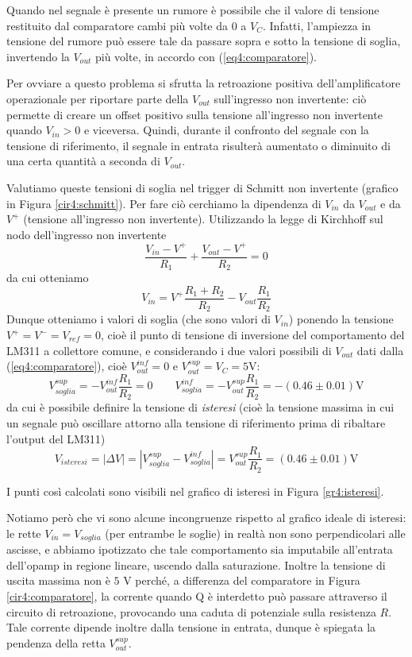Quando nel segnale è presente un rumore è possibile che il valore di tensione restituito dal comparatore cambi più volte da $0$ a $V_{C}$.
Infatti, l'ampiezza in tensione del rumore può essere tale da passare sopra e sotto la tensione di soglia, invertendo la $V_{out}$ più volte, in accordo con (\ref{eq4:comparatore}).

Per ovviare a questo problema si sfrutta la retroazione positiva dell'amplificatore operazionale per riportare parte della $V_{out}$ sull'ingresso non invertente: ciò permette di creare un offset positivo sulla tensione all'ingresso non invertente quando $V_{in}>0$ e viceversa.
Quindi, durante il confronto del segnale con la tensione di riferimento, il segnale in entrata risulterà aumentato o diminuito di una certa quantità a seconda di $V_{out}$.

Valutiamo queste tensioni di soglia nel trigger di Schmitt non invertente (grafico in Figura \ref{cir4:schmitt}).
Per fare ciò cerchiamo la dipendenza di $V_{in}$ da $V_{out}$ e da $V^+$ (tensione all'ingresso non invertente). Utilizzando la legge di Kirchhoff sul nodo dell'ingresso non invertente
$$\frac{V_{in}-V^+}{R_1} + \frac{V_{out}-V^+}{R_2} = 0$$
da cui otteniamo
\begin{equation}
V_{in} = V^+ \frac{R_1+R_2}{R_2} - V_{out} \frac{R_1}{R_2}
\label{eq4:v_in_parte2}
\end{equation}
Dunque otteniamo i valori di soglia (che sono valori di $V_{in}$) ponendo la tensione $V^+=V^-=V_{ref}=0$, cioè il punto di tensione di inversione del comportamento del LM311 a collettore comune, e considerando i due valori possibili di $V_{out}$ dati dalla (\ref{eq4:comparatore}), cioè $V_{out}^{inf}=0$ e $V_{out}^{sup}=V_{C}=5$\si{\volt}:
$$V_{soglia}^{sup} = - V_{out}^{inf} \frac{R_1}{R_2} = 0 \qquad V_{soglia}^{inf} = - V_{out}^{sup} \frac{R_1}{R_2} = - (0.46 \pm 0.01) \si{\volt}$$
da cui è possibile definire la tensione di \textit{isteresi} (cioè la tensione massima in cui un segnale può oscillare attorno alla tensione di riferimento prima di ribaltare l'output del LM311)
$$V_{isteresi} = |\Delta V| = |V_{soglia}^{sup} - V_{soglia}^{inf}| = V_{out}^{sup} \frac{R_1}{R_2} = (0.46 \pm 0.01) \si{\volt}$$

I punti così calcolati sono visibili nel grafico di isteresi in Figura \ref{gr4:isteresi}.

Notiamo però che vi sono alcune incongruenze rispetto al grafico ideale di isteresi: le rette $V_{in}=V_{soglia}$ (per entrambe le soglie) in realtà non sono perpendicolari alle ascisse, e abbiamo ipotizzato che tale comportamento sia imputabile all'entrata dell'opamp in regione lineare, uscendo dalla saturazione.
Inoltre la tensione di uscita massima non è $5$ \si{\volt} perché, a differenza del comparatore in Figura \ref{cir4:comparatore}, la corrente quando Q è interdetto può passare attraverso il circuito di retroazione, provocando una caduta di potenziale sulla resistenza $R$.
Tale corrente dipende inoltre dalla tensione in entrata, dunque è spiegata la pendenza della retta $V_{out}^{sup}$.

